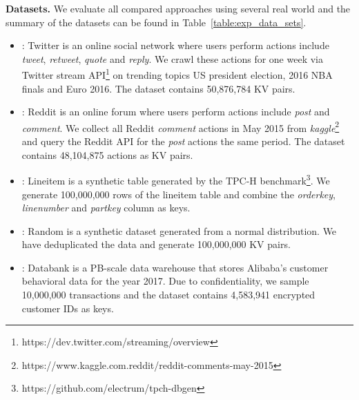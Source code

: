 \vspace{1mm}\noindent\textbf{Datasets.} We evaluate all compared approaches using several real world and the summary of the datasets can be found in Table~\ref{table:exp_data_sets}.
\begin{itemize}
	\item \dstwitter: Twitter is an online social network where users perform actions include \emph{tweet}, \emph{retweet}, \emph{quote} and \emph{reply}.
	We crawl these actions for one week via Twitter stream API\footnote{https://dev.twitter.com/streaming/overview} on trending topics US president election, 2016 NBA finals and Euro 2016. The dataset contains 50,876,784 KV pairs.
	\item \dsreddit: Reddit is an online forum where users perform actions include \emph{post} and \emph{comment}. We collect all Reddit \emph{comment} actions in May 2015 from \emph{kaggle}\footnote{https://www.kaggle.com.reddit/reddit-comments-may-2015} and query the Reddit API for the \emph{post} actions the same period. The dataset contains 48,104,875 actions as KV pairs. 
 	\item \dstpch: Lineitem is a synthetic table generated by the TPC-H benchmark\footnote{https://github.com/electrum/tpch-dbgen}. We generate  100,000,000 rows of the lineitem table and combine the \emph{orderkey}, \emph{linenumber} and \emph{partkey} column as keys. 
	\item \dsrandom: Random is a synthetic dataset generated from a normal distribution. We have deduplicated the data and generate 100,000,000 KV pairs.  
	\item \dsali: Databank is a PB-scale data warehouse that stores Alibaba's customer behavioral data for the year 2017. Due to confidentiality, we sample 10,000,000 transactions and the dataset contains 4,583,941 encrypted customer IDs as keys.
\end{itemize}





